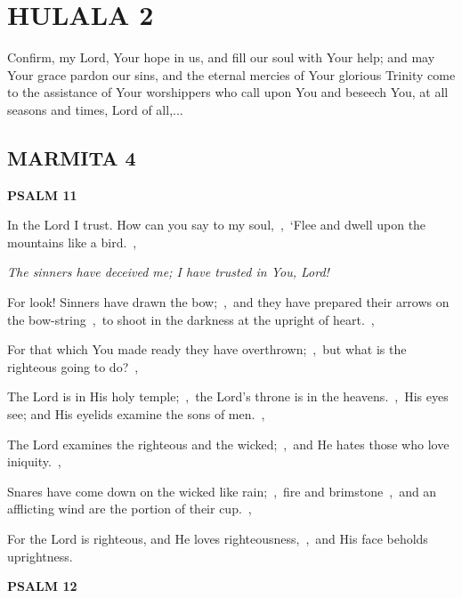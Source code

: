 \documentclass[12pt,twoside,a5paper]{article}
\newcommand{\hulala}[1]{\section*{HULALA {#1}}}
\newcommand{\marmita}[1]{\subsection*{MARMITA {#1}}}
\newcommand{\psalm}[1]{\textbf{PSALM {#1}}\nopagebreak}
\newcommand{\qanona}[1]{{\liturgicalhint{Qanona.} \emph{#1}}}
\newcommand{\slota}[1]{\liturgicalhint{Slota.} #1}
\begin{document}

\hulala{2}

\slota{Confirm, my Lord, Your hope in us, and fill our soul with Your help; and may Your grace pardon our sins, and the eternal mercies of Your glorious Trinity come to the assistance of Your worshippers who call upon You and beseech You, at all seasons and times, Lord of all,...}

\marmita{4}

\psalm{11}

\begin{normalparskip}
  In the Lord I trust. How can you say to my soul,~\sep\ ‘Flee and dwell upon the mountains like a bird.~\sep

  \qanona{The sinners have deceived me; I have trusted in You, Lord!}

  For look! Sinners have drawn the bow;~\sep\ and they have prepared their arrows on the bow-string~\sep\ to shoot in the darkness at the upright of heart.~\sep

  For that which You made ready they have overthrown;~\sep\ but what is the righteous going to do?~\sep

  The Lord is in His holy temple;~\sep\ the Lord's throne is in the heavens.~\sep\ His eyes see; and His eyelids examine the sons of men.~\sep

  The Lord examines the righteous and the wicked;~\sep\ and He hates those who love iniquity.~\sep

  Snares have come down on the wicked like rain;~\sep\ fire and brimstone~\sep\ and an afflicting wind are the portion of their cup.~\sep

  For the Lord is righteous, and He loves righteousness,~\sep\ and His face beholds uprightness.
\end{normalparskip}

\psalm{12}
\end{document}
